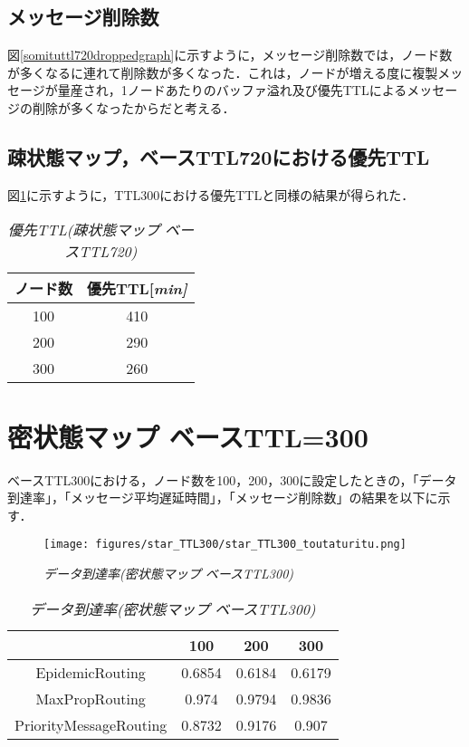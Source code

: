 \documentclass[11pt]{icsthesis}
\begin{document}
\subsection{メッセージ削除数}
図\ref{somituttl720droppedgraph}に示すように，メッセージ削除数では，ノード数が多くなるに連れて削除数が多くなった．これは，ノードが増える度に複製メッセージが量産され，1ノードあたりのバッファ溢れ及び優先TTLによるメッセージの削除が多くなったからだと考える．

\subsection{疎状態マップ，ベースTTL720における優先TTL}
図\ref{priorityTTL_somitsu720}に示すように，TTL300における優先TTLと同様の結果が得られた．
\begin{table}[H]
	\begin{center}
			 \caption[]{\it{優先TTL(疎状態マップ ベースTTL720)}}
			 \label{priorityTTL_somitsu720}
			 \begin{tabular}{|c|c|}
 \hline
 ノード数&優先TTL[\it{min}]\\
 \hline
 100&410\\
 \hline
 200&290\\
 \hline
 300&260\\
 \hline
			 \end{tabular}
		 \end{center}
 \end{table}

\section{密状態マップ ベースTTL=300}
ベースTTL300における，ノード数を100，200，300に設定したときの，「データ到達率」，「メッセージ平均遅延時間」，「メッセージ削除数」の結果を以下に示す．

\begin{figure}[h]
\centering
\texttt{[image: figures/star\_TTL300/star\_TTL300\_toutaturitu.png]}
\caption[]{\it{データ到達率(密状態マップ ベースTTL300)}}
\label{kamituttl300deliveryprobgraph}
\end{figure}

\begin{table}[H]
 \begin{center}
      \caption[]{\it{データ到達率(密状態マップ ベースTTL300)}}
      \label{kamituttl300deliveryprob}
      \begin{tabular}{|c|c|c|c|}
\hline
&100&200&300\\
\hline
EpidemicRouting&0.6854&0.6184&0.6179\\
\hline
MaxPropRouting&0.974&0.9794&0.9836\\
\hline
PriorityMessageRouting&0.8732&0.9176&0.907\\
\hline
      \end{tabular}
    \end{center}
\end{table}
\end{document}
